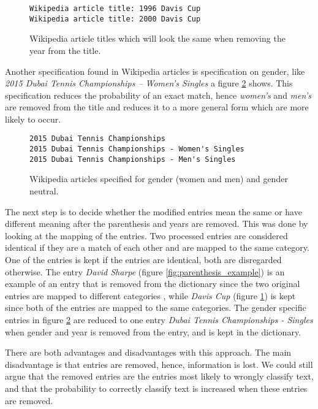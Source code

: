 \begin{figure}[h]
\centering
\begin{lstlisting}
Wikipedia article title: 1996 Davis Cup
Wikipedia article title: 2000 Davis Cup
\end{lstlisting}
\caption[Wikipedia article title with year]{Wikipedia article titles which will look the same when removing the year from the title.}
\label{fig:davis_cups}
\end{figure}

Another specification found in Wikipedia articles is specification on gender, like \emph{2015 Dubai Tennis Championships – Women's Singles} a figure \ref{fig:dubai_gender} shows. This specification reduces the probability of an exact match, hence \emph{women's} and \emph{men's} are removed from the title and reduces it to a more general form which are more likely to occur. 

\begin{figure}[h]
\centering
\begin{lstlisting}
2015 Dubai Tennis Championships
2015 Dubai Tennis Championships - Women's Singles
2015 Dubai Tennis Championships - Men's Singles
\end{lstlisting}
\caption[Wikipedia article title with gender]{Wikipedia articles specified for gender (women and men) and gender neutral.}
\label{fig:dubai_gender}
\end{figure}

The next step is to decide whether the modified entries mean the same or have different meaning after the parenthesis and years are removed. This was done by looking at the mapping of the entries. Two processed entries are considered identical if they are a match of each other and are mapped to the same category. One of the entries is kept if the entries are identical, both are disregarded otherwise. The entry \emph{David Sharpe} (figure \ref{fig:parenthesis_example}) is an example of an entry that is removed from the dictionary since the two original entries are mapped to different categories , while \emph{Davis Cup} (figure \ref{fig:davis_cups}) is kept since both of the entries are mapped to the same categories. The gender specific entries in figure \ref{fig:dubai_gender} are reduced to one entry \emph{Dubai Tennis Championships - Singles} when gender and year is removed from the entry, and is kept in the dictionary.

There are both advantages and disadvantages with this approach. The main disadvantage is that entries are removed, hence, information is lost. We could still argue that the removed entries are the entries most likely to wrongly classify text, and that the probability to correctly classify text is increased when these entries are removed. 

